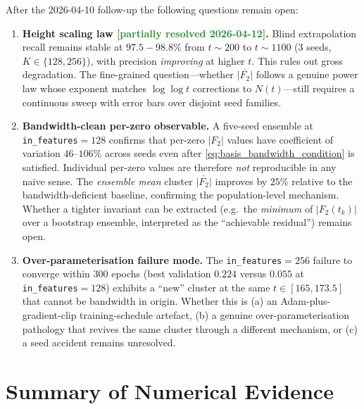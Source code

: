 \documentclass[11pt, a4paper]{article}
\theoremstyle{definition}
\theoremstyle{plain}
\begin{document}
After the 2026-04-10 follow-up the following questions remain
open:
\begin{enumerate}
  \item \textbf{Height scaling law
        \textcolor{ForestGreen}{[partially resolved 2026-04-12]}.}
        Blind extrapolation recall remains stable at
        $97.5{-}98.8\%$ from $t{\sim}200$ to $t{\sim}1100$
        (3 seeds, $K\in\{128,256\}$), with precision
        \emph{improving} at higher $t$.  This rules out gross
        degradation.  The fine-grained question---whether
        $\overline{|F_2|}$ follows a genuine power law whose
        exponent matches $\log\log t$ corrections to
        $N(t)$---still requires a continuous sweep with error
        bars over disjoint seed families.
  \item \textbf{Bandwidth-clean per-zero observable.} A
        five-seed ensemble at \texttt{in\_features}$=128$ confirms
        that per-zero $|F_2|$ values have coefficient of variation
        $46$--$106\%$ across seeds even after
        \eqref{eq:basis_bandwidth_condition} is satisfied.
        Individual per-zero values are therefore \emph{not}
        reproducible in any naive sense. The \emph{ensemble mean}
        cluster $\overline{|F_2|}$ improves by $25\%$ relative to
        the bandwidth-deficient baseline, confirming the
        population-level mechanism. Whether a tighter invariant
        can be extracted (e.g.\ the \emph{minimum} of $|F_2(t_k)|$
        over a bootstrap ensemble, interpreted as the ``achievable
        residual'') remains open.
  \item \textbf{Over-parameterisation failure mode.} The
        \texttt{in\_features}$=256$ failure to converge within
        $300$ epochs (best validation $0.224$ versus $0.055$ at
        \texttt{in\_features}$=128$) exhibits a ``new'' cluster
        at the same $t\in[165,173.5]$ that cannot be bandwidth
        in origin. Whether this is (a) an Adam-plus-gradient-clip
        training-schedule artefact, (b) a genuine
        over-parameterisation pathology that revives the same
        cluster through a different mechanism, or (c) a seed
        accident remains unresolved.
\end{enumerate}


\section*{Summary of Numerical Evidence}
\label{sec:summary}
\end{document}

